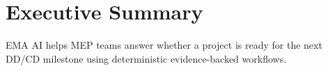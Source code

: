 \section*{Executive Summary}
EMA AI helps MEP teams answer whether a project is ready for the next DD/CD milestone using deterministic evidence-backed workflows.

